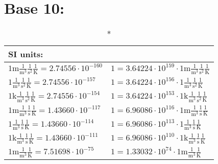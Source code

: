 \chapter{Base 10:}
\begin{center}\begin{longtable}{l l}\caption*{SI units: }\\\hline{\color{gray}$1 \bm{\mathrm{ m}}\frac1{\operatorname{m}^3}\frac1{\operatorname{s}^2}{}\frac1{\operatorname{K}} = 2.74556\cdot10^{-160} $}   & {\color{gray}$ 1 = 3.64224\cdot10^{159} \cdot 1 \bm{\mathrm{ m}}\frac1{\operatorname{m}^3}\frac1{\operatorname{s}^2}{}\frac1{\operatorname{K}}$}  \\
{\color{black}$1 \bm{\mathrm{ }}\frac1{\operatorname{m}^3}\frac1{\operatorname{s}^2}{}\frac1{\operatorname{K}} = 2.74556\cdot10^{-157} $}   & {\color{black}$ 1 = 3.64224\cdot10^{156} \cdot 1 \bm{\mathrm{ }}\frac1{\operatorname{m}^3}\frac1{\operatorname{s}^2}{}\frac1{\operatorname{K}}$}  \\
{\color{gray}$1 \bm{\mathrm{ k}}\frac1{\operatorname{m}^3}\frac1{\operatorname{s}^2}{}\frac1{\operatorname{K}} = 2.74556\cdot10^{-154} $}   & {\color{gray}$ 1 = 3.64224\cdot10^{153} \cdot 1 \bm{\mathrm{ k}}\frac1{\operatorname{m}^3}\frac1{\operatorname{s}^2}{}\frac1{\operatorname{K}}$}  \\
{\color{gray}$1 \bm{\mathrm{ m}}\frac1{\operatorname{m}^3}\frac1{\operatorname{s}}{}\frac1{\operatorname{K}} = 1.43660\cdot10^{-117} $}   & {\color{gray}$ 1 = 6.96086\cdot10^{116} \cdot 1 \bm{\mathrm{ m}}\frac1{\operatorname{m}^3}\frac1{\operatorname{s}}{}\frac1{\operatorname{K}}$}  \\
{\color{black}$1 \bm{\mathrm{ }}\frac1{\operatorname{m}^3}\frac1{\operatorname{s}}{}\frac1{\operatorname{K}} = 1.43660\cdot10^{-114} $}   & {\color{black}$ 1 = 6.96086\cdot10^{113} \cdot 1 \bm{\mathrm{ }}\frac1{\operatorname{m}^3}\frac1{\operatorname{s}}{}\frac1{\operatorname{K}}$}  \\
{\color{gray}$1 \bm{\mathrm{ k}}\frac1{\operatorname{m}^3}\frac1{\operatorname{s}}{}\frac1{\operatorname{K}} = 1.43660\cdot10^{-111} $}   & {\color{gray}$ 1 = 6.96086\cdot10^{110} \cdot 1 \bm{\mathrm{ k}}\frac1{\operatorname{m}^3}\frac1{\operatorname{s}}{}\frac1{\operatorname{K}}$}  \\
{\color{gray}$1 \bm{\mathrm{ m}}\frac1{\operatorname{m}^3}{}{}\frac1{\operatorname{K}} = 7.51698\cdot10^{-75} $}   & {\color{gray}$ 1 = 1.33032\cdot10^{74} \cdot 1 \bm{\mathrm{ m}}\frac1{\operatorname{m}^3}{}{}\frac1{\operatorname{K}}$}  \\

\end{longtable}
\end{center}
